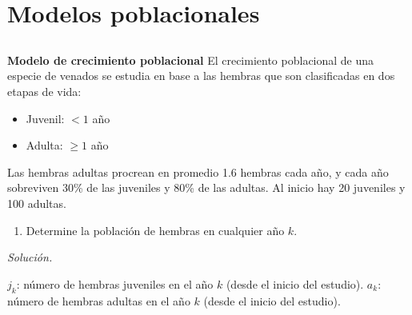 \section{Modelos poblacionales}

\subsection{}

\begin{frame} 
	
	\begin{ejer}{\textbf{Modelo de crecimiento poblacional}} \justifying
		El crecimiento poblacional de una especie de venados se estudia en base a las hembras que son clasificadas en dos etapas de vida:
		
		\vspace{-2mm}
		\begin{multicols}{2}
			\begin{itemize}
				\item Juvenil: $<1$ año
				\item Adulta: $\ge 1$ año
			\end{itemize}
		\end{multicols}
	
		\vspace{-2mm}
		Las hembras adultas procrean en promedio 1.6 hembras cada año, y cada año sobreviven 30\% de las juveniles y 80\% de las adultas. Al inicio hay 20 juveniles y 100 adultas.
		\begin{enumerate}[$a$]
			\item Determine la población de hembras en cualquier año $k$.
		\end{enumerate}
	\end{ejer}
	
	\textit{Solución.}
	
	\vspace{2mm}
	
	$j_k$: número de hembras juveniles en el año $k$ (desde el inicio del estudio).
	$a_k$: número de hembras adultas en el año $k$ (desde el inicio del estudio).
	

\end{frame}
